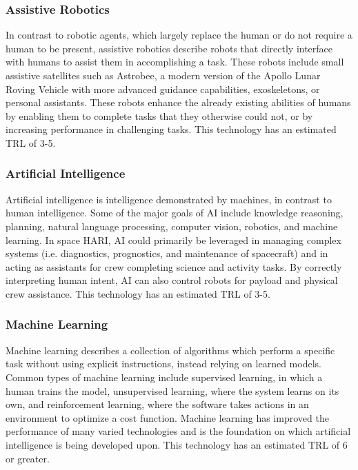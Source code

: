 \subsubsection{Assistive Robotics}
In contrast to robotic agents, which largely replace the human or do not require a human to be present, assistive robotics describe robots that directly interface with humans to assist them in accomplishing a task. These robots include small assistive satellites such as Astrobee, a modern version of the Apollo Lunar Roving Vehicle with more advanced guidance capabilities, exoskeletons, or personal assistants. These robots enhance the already existing abilities of humans by enabling them to complete tasks that they otherwise could not, or by increasing performance in challenging tasks. This technology has an estimated TRL of 3-5.

\subsubsection{Artificial Intelligence}
Artificial intelligence is intelligence demonstrated by machines, in contrast to human intelligence. Some of the major goals of AI include knowledge reasoning, planning, natural language processing, computer vision, robotics, and machine learning. In space HARI, AI could primarily be leveraged in managing complex systems (i.e. diagnostics, prognostics, and maintenance of spacecraft) and in acting as assistants for crew completing science and activity tasks. By correctly interpreting human intent, AI can also control robots for payload and physical crew assistance. This technology has an estimated TRL of 3-5.

\subsubsection{Machine Learning}
Machine learning describes a collection of algorithms which perform a specific task without using explicit instructions, instead relying on learned models. Common types of machine learning include supervised learning, in which a human trains the model, unsupervised learning, where the system learns on its own, and reinforcement learning, where the software takes actions in an environment to optimize a cost function. Machine learning has improved the performance of many varied technologies and is the foundation on which artificial intelligence is being developed upon. This technology has an estimated TRL of 6 or greater.

